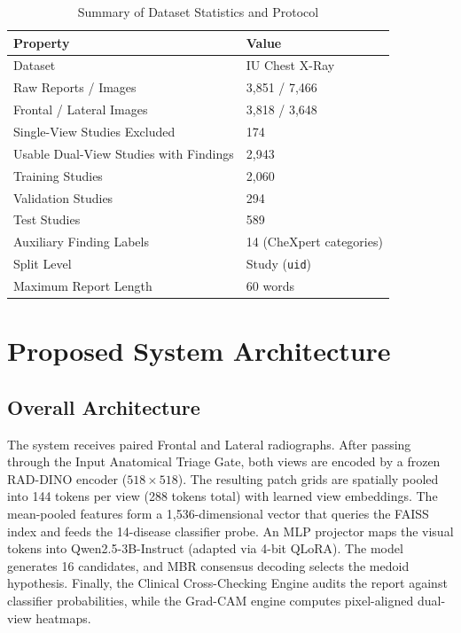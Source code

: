 \documentclass[12pt,a4paper]{report}
\begin{document}
\begin{table}[htbp]
\centering
\caption{Summary of Dataset Statistics and Protocol}
\label{tab:dataset_stats}
\begin{tabular}{ll}
\toprule
\textbf{Property} & \textbf{Value} \\
\midrule
Dataset & IU Chest X-Ray \\
Raw Reports / Images & 3,851 / 7,466 \\
Frontal / Lateral Images & 3,818 / 3,648 \\
Single-View Studies Excluded & 174 \\
Usable Dual-View Studies with Findings & 2,943 \\
Training Studies & 2,060 \\
Validation Studies & 294 \\
Test Studies & 589 \\
Auxiliary Finding Labels & 14 (CheXpert categories) \\
Split Level & Study (\texttt{uid}) \\
Maximum Report Length & 60 words \\
\bottomrule
\end{tabular}
\end{table}

\chapter{Proposed System Architecture}

\section{Overall Architecture}
The system receives paired Frontal and Lateral radiographs. After passing through the Input Anatomical Triage Gate, both views are encoded by a frozen RAD-DINO encoder ($518 \times 518$). The resulting patch grids are spatially pooled into 144 tokens per view (288 tokens total) with learned view embeddings. The mean-pooled features form a 1,536-dimensional vector that queries the FAISS index and feeds the 14-disease classifier probe. An MLP projector maps the visual tokens into Qwen2.5-3B-Instruct (adapted via 4-bit QLoRA). The model generates 16 candidates, and MBR consensus decoding selects the medoid hypothesis. Finally, the Clinical Cross-Checking Engine audits the report against classifier probabilities, while the Grad-CAM engine computes pixel-aligned dual-view heatmaps.
\end{document}
